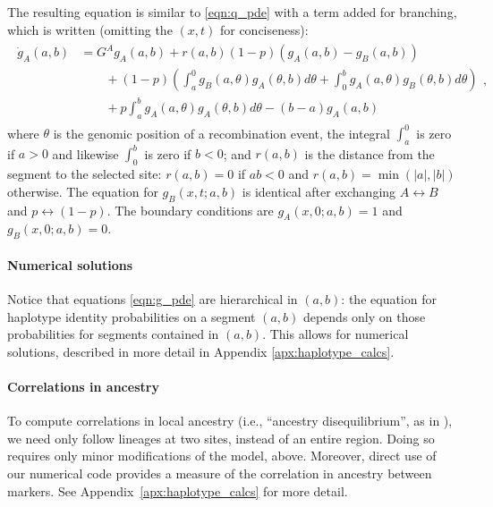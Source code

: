 \documentclass[11pt,letterpaper]{article}
\begin{document}
The resulting equation is similar to \eqref{eqn:q_pde} with a term added for branching,
which is written (omitting the $(x,t)$ for conciseness):
\begin{align}
    \begin{aligned} \label{eqn:g_pde}
        \dot g_A(a,b) 
        &= G^A g_A(a,b) + r(a,b) (1-p) (g_A(a,b)-g_B(a,b))
            \\ {} & \qquad 
            + (1-p) \left( 
                \int_a^0 g_B(a,\theta) g_A(\theta,b) d\theta
                + \int_0^b g_A(a,\theta) g_B(\theta,b) d\theta 
            \right)
            \\ {} & \qquad 
            + p \int_a^b {
                g_A(a,\theta) g_A(\theta,b) 
            } d\theta
            - (b-a) g_A(a,b)  
    \end{aligned} ,
\end{align}
where $\theta$ is the genomic position of a recombination event, 
the integral $\int_a^0$ is zero if $a>0$ and likewise $\int_0^b$ is zero if $b<0$;
and $r(a,b)$ is the distance from the segment to the selected site:
$r(a,b)=0$ if $ab<0$ and $r(a,b)=\min(|a|,|b|)$ otherwise.
The equation for $g_B(x,t;a,b)$ is identical after exchanging $A \leftrightarrow B$ and
$p \leftrightarrow (1-p)$.
The boundary conditions are $g_A(x,0;a,b)=1$ and $g_B(x,0;a,b)=0$.

\paragraph{Numerical solutions}
Notice that equations \eqref{eqn:g_pde}
are hierarchical in $(a,b)$:
the equation for haplotype identity probabilities on a segment $(a,b)$ depends only on those probabilities for segments contained in $(a,b)$.
This allows for numerical solutions, %
described in more detail in Appendix \ref{apx:haplotype_calcs}.


\paragraph{Correlations in ancestry}
To compute correlations in local ancestry
(i.e., ``ancestry disequilibrium'', as in \citet{pool2015mosaic,Schumer2016}),
we need only follow lineages at two sites, instead of an entire region. 
Doing so requires only minor modifications of the model, above. 
Moreover, direct use of our numerical code provides a measure of the correlation in ancestry between markers. 
See Appendix~\ref{apx:haplotype_calcs} for more detail.
\end{document}
